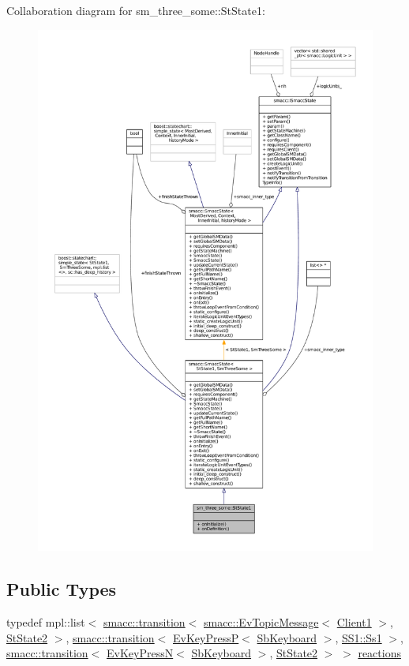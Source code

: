 Collaboration diagram for sm\+\_\+three\+\_\+some\+:\+:St\+State1\+:
\nopagebreak
\begin{figure}[H]
\begin{center}
\leavevmode
\includegraphics[width=350pt]{structsm__three__some_1_1StState1__coll__graph}
\end{center}
\end{figure}
\subsection*{Public Types}
\begin{DoxyCompactItemize}
\item 
typedef mpl\+::list$<$ \hyperlink{classsmacc_1_1transition}{smacc\+::transition}$<$ \hyperlink{structsmacc_1_1EvTopicMessage}{smacc\+::\+Ev\+Topic\+Message}$<$ \hyperlink{classsm__three__some_1_1Client1}{Client1} $>$, \hyperlink{structsm__three__some_1_1StState2}{St\+State2} $>$, \hyperlink{classsmacc_1_1transition}{smacc\+::transition}$<$ \hyperlink{structsm__three__some_1_1EvKeyPressP}{Ev\+Key\+PressP}$<$ \hyperlink{classsm__three__some_1_1SbKeyboard}{Sb\+Keyboard} $>$, \hyperlink{structsm__three__some_1_1SS1_1_1Ss1}{S\+S1\+::\+Ss1} $>$, \hyperlink{classsmacc_1_1transition}{smacc\+::transition}$<$ \hyperlink{structsm__three__some_1_1EvKeyPressN}{Ev\+Key\+PressN}$<$ \hyperlink{classsm__three__some_1_1SbKeyboard}{Sb\+Keyboard} $>$, \hyperlink{structsm__three__some_1_1StState2}{St\+State2} $>$ $>$ \hyperlink{structsm__three__some_1_1StState1_a3b704f5c0b64587744c384df09ec0788}{reactions}
\end{DoxyCompactItemize}
